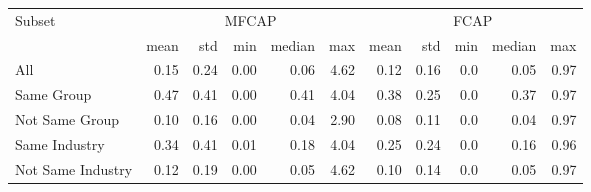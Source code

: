\begin{tabular}{lrrrrrrrrrr}
\toprule
\multirow{2}{*}{Subset}& \multicolumn{5}{c}{MFCAP} & \multicolumn{5}{c}{FCAP} \\
\cmidrule(lr){2-6} \cmidrule(lr){7-11}
&       mean &    std &    min & median &    max &         mean &    std &    min & median &    max \\
\midrule
All               &  0.15 &  0.24 &  0.00 &   0.06 &  4.62 &  0.12 &  0.16 &  0.0 &   0.05 &  0.97 \\
Same Group        &  0.47 &  0.41 &  0.00 &   0.41 &  4.04 &  0.38 &  0.25 &  0.0 &   0.37 &  0.97 \\
Not Same Group    &  0.10 &  0.16 &  0.00 &   0.04 &  2.90 &  0.08 &  0.11 &  0.0 &   0.04 &  0.97 \\
Same Industry     &  0.34 &  0.41 &  0.01 &   0.18 &  4.04 &  0.25 &  0.24 &  0.0 &   0.16 &  0.96 \\
Not Same Industry &  0.12 &  0.19 &  0.00 &   0.05 &  4.62 &  0.10 &  0.14 &  0.0 &   0.05 &  0.97 \\
\bottomrule
\end{tabular}
